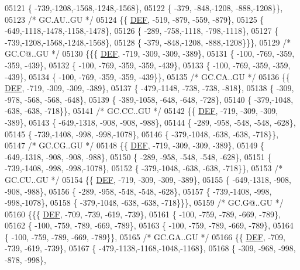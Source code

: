 \begin{DoxyCode}
05121 \{ -739,-1208,-1568,-1248,-1568\},
05122 \{ -379, -848,-1208, -888,-1208\}\},
05123 \textcolor{comment}{/* GC.AU..GU */}
05124 \{\{  \mbox{\hyperlink{1_88_84__epars_8h_a397419fc12b37ed479c8abb9d444d843}{DEF}}, -519, -879, -559, -879\},
05125 \{ -649,-1118,-1478,-1158,-1478\},
05126 \{ -289, -758,-1118, -798,-1118\},
05127 \{ -739,-1208,-1568,-1248,-1568\},
05128 \{ -379, -848,-1208, -888,-1208\}\}\},
05129 \textcolor{comment}{/* GC.C@..GU */}
05130 \{\{\{  \mbox{\hyperlink{1_88_84__epars_8h_a397419fc12b37ed479c8abb9d444d843}{DEF}}, -719, -309, -309, -389\},
05131 \{ -100, -769, -359, -359, -439\},
05132 \{ -100, -769, -359, -359, -439\},
05133 \{ -100, -769, -359, -359, -439\},
05134 \{ -100, -769, -359, -359, -439\}\},
05135 \textcolor{comment}{/* GC.CA..GU */}
05136 \{\{  \mbox{\hyperlink{1_88_84__epars_8h_a397419fc12b37ed479c8abb9d444d843}{DEF}}, -719, -309, -309, -389\},
05137 \{ -479,-1148, -738, -738, -818\},
05138 \{ -309, -978, -568, -568, -648\},
05139 \{ -389,-1058, -648, -648, -728\},
05140 \{ -379,-1048, -638, -638, -718\}\},
05141 \textcolor{comment}{/* GC.CC..GU */}
05142 \{\{  \mbox{\hyperlink{1_88_84__epars_8h_a397419fc12b37ed479c8abb9d444d843}{DEF}}, -719, -309, -309, -389\},
05143 \{ -649,-1318, -908, -908, -988\},
05144 \{ -289, -958, -548, -548, -628\},
05145 \{ -739,-1408, -998, -998,-1078\},
05146 \{ -379,-1048, -638, -638, -718\}\},
05147 \textcolor{comment}{/* GC.CG..GU */}
05148 \{\{  \mbox{\hyperlink{1_88_84__epars_8h_a397419fc12b37ed479c8abb9d444d843}{DEF}}, -719, -309, -309, -389\},
05149 \{ -649,-1318, -908, -908, -988\},
05150 \{ -289, -958, -548, -548, -628\},
05151 \{ -739,-1408, -998, -998,-1078\},
05152 \{ -379,-1048, -638, -638, -718\}\},
05153 \textcolor{comment}{/* GC.CU..GU */}
05154 \{\{  \mbox{\hyperlink{1_88_84__epars_8h_a397419fc12b37ed479c8abb9d444d843}{DEF}}, -719, -309, -309, -389\},
05155 \{ -649,-1318, -908, -908, -988\},
05156 \{ -289, -958, -548, -548, -628\},
05157 \{ -739,-1408, -998, -998,-1078\},
05158 \{ -379,-1048, -638, -638, -718\}\}\},
05159 \textcolor{comment}{/* GC.G@..GU */}
05160 \{\{\{  \mbox{\hyperlink{1_88_84__epars_8h_a397419fc12b37ed479c8abb9d444d843}{DEF}}, -709, -739, -619, -739\},
05161 \{ -100, -759, -789, -669, -789\},
05162 \{ -100, -759, -789, -669, -789\},
05163 \{ -100, -759, -789, -669, -789\},
05164 \{ -100, -759, -789, -669, -789\}\},
05165 \textcolor{comment}{/* GC.GA..GU */}
05166 \{\{  \mbox{\hyperlink{1_88_84__epars_8h_a397419fc12b37ed479c8abb9d444d843}{DEF}}, -709, -739, -619, -739\},
05167 \{ -479,-1138,-1168,-1048,-1168\},
05168 \{ -309, -968, -998, -878, -998\},

\end{DoxyCode}
